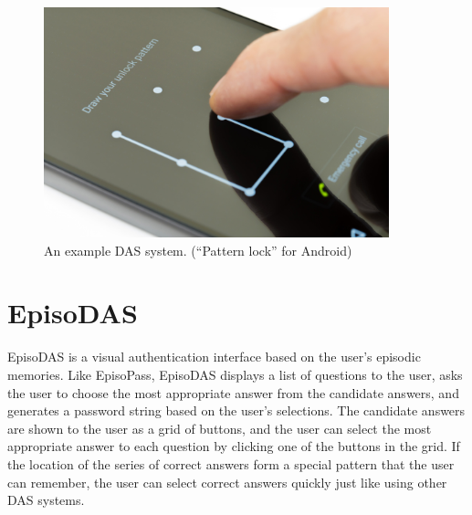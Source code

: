 \documentclass[sigconf]{acmart}
\begin{document}
\begin{figure}[t]
  \includegraphics[width=10cm,bb=-60 0 940 667]{figures/AndroidLock.jpg}
  \caption{An example DAS system. (``Pattern lock'' for Android)}
  \label{AndroidLock}
\end{figure}

\section{EpisoDAS}

EpisoDAS is a visual authentication interface
based on the user's episodic memories.
Like EpisoPass,
EpisoDAS displays a list of questions to the user,
asks the user to choose the most appropriate answer from the candidate answers,
and generates a password string based on the user's selections.
%
% 
%
The candidate answers are shown to the user as a grid of buttons,
and the user can select the most appropriate answer to each question
by clicking one of the buttons in the grid.
%
If the location of the series of correct answers form a special
pattern that the user can remember, the user can select
correct answers quickly just like using other DAS systems.

\end{document}
